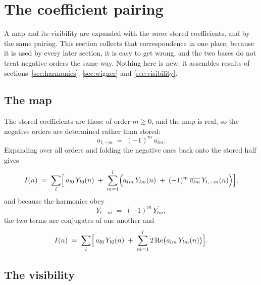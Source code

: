 
\section{The coefficient pairing}
\label{sec:pairing}

A map and its visibility are expanded with the \emph{same} stored coefficients, and by the
same pairing.  This section collects that correspondence in one place, because it is used by
every later section, it is easy to get wrong, and the two bases do not treat negative orders
the same way.  Nothing here is new: it assembles results of
sections~\ref{sec:harmonics}, \ref{sec:wigner} and \ref{sec:visibility}.

\subsection{The map}
\label{sec:pairing-map}

The stored coefficients are those of order $m \ge 0$, and the map is real, so the negative
orders are determined rather than stored:
\begin{equation}
  a_{l,-m} \;=\; (-1)^m\,\overline{a_{lm}} .
  \label{eq:pairing-reality}
\end{equation}
Expanding over all orders and folding the negative ones back onto the stored half gives
\begin{equation}
  I(n) \;=\; \sum_{l}\Bigl[\, a_{l0}\,Y_{l0}(n)
    \;+\; \sum_{m=1}^{l}\Bigl( a_{lm}\,Y_{lm}(n)
    \;+\; (-1)^m\,\overline{a_{lm}}\,Y_{l,-m}(n) \Bigr) \Bigr] ,
  \label{eq:pairing-map}
\end{equation}
and because the harmonics obey
\begin{equation}
  Y_{l,-m} \;=\; (-1)^m\,\overline{Y_{lm}} ,
  \label{eq:pairing-y-negative}
\end{equation}
the two terms are conjugates of one another and
\begin{equation}
  I(n) \;=\; \sum_{l}\Bigl[\, a_{l0}\,Y_{l0}(n)
    \;+\; \sum_{m=1}^{l} 2\,\mathrm{Re}\bigl( a_{lm}\,Y_{lm}(n) \bigr) \Bigr] .
  \label{eq:pairing-map-real}
\end{equation}

\subsection{The visibility}
\label{sec:pairing-visibility}

